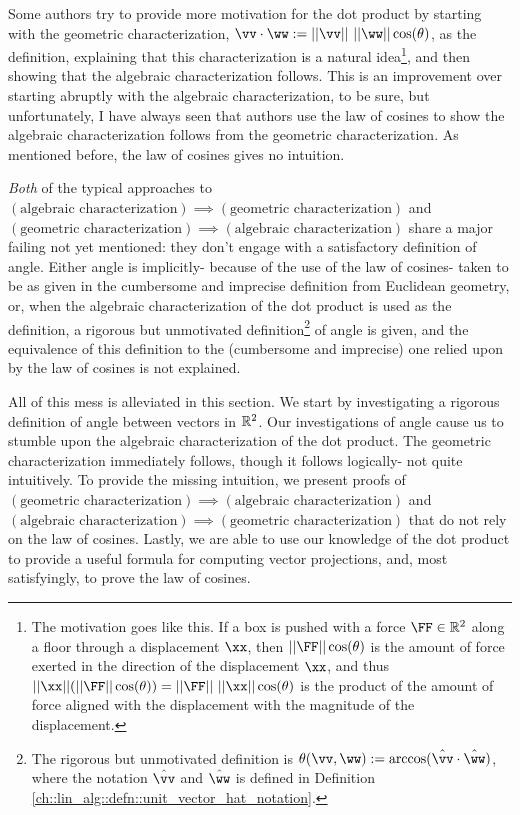 Some authors try to provide more motivation for the dot product by starting with the geometric characterization, $\vv \cdot \ww := ||\vv|| \spc ||\ww|| \cos(\theta)$, as the definition, explaining that this characterization is a natural idea\footnote{The motivation goes like this. If a box is pushed with a force $\FF \in \R^2$ along a floor through a displacement $\xx$, then $||\FF|| \cos(\theta)$ is the amount of force exerted in the direction of the displacement $\xx$, and thus $||\xx||(||\FF|| \cos(\theta)) = ||\FF|| \spc ||\xx|| \cos(\theta)$ is the product of the amount of force aligned with the displacement with the magnitude of the displacement.}, and then showing that the algebraic characterization follows. This is an improvement over starting abruptly with the algebraic characterization, to be sure, but unfortunately, I have always seen that authors use the law of cosines to show the algebraic characterization follows from the geometric characterization. As mentioned before, the law of cosines gives no intuition.

\textit{Both} of the typical approaches to $(\text{algebraic characterization}) \implies (\text{geometric characterization})$ and $(\text{geometric characterization}) \implies (\text{algebraic characterization})$ share a major failing not yet mentioned: they don't engage with a satisfactory definition of angle. Either angle is implicitly- because of the use of the law of cosines- taken to be as given in the cumbersome and imprecise definition from Euclidean geometry, or, when the algebraic characterization of the dot product is used as the definition, a rigorous but unmotivated definition\footnote{The rigorous but unmotivated definition is $\theta(\vv, \ww) := \arccos(\hvv \cdot \hww)$, where the notation $\hvv$ and $\hww$ is defined in Definition \ref{ch::lin_alg::defn::unit_vector_hat_notation}.} of angle is given, and the equivalence of this definition to the (cumbersome and imprecise) one relied upon by the law of cosines is not explained.

All of this mess is alleviated in this section. We start by investigating a rigorous definition of angle between vectors in $\mathbb{R}^2$. Our investigations of angle cause us to stumble upon the algebraic characterization of the dot product. The geometric characterization immediately follows, though it follows logically- not quite intuitively. To provide the missing intuition, we present proofs of $(\text{geometric characterization}) \implies (\text{algebraic characterization})$ and $(\text{algebraic characterization}) \implies (\text{geometric characterization})$ that do not rely on the law of cosines. Lastly, we are able to use our knowledge of the dot product to provide a useful formula for computing vector projections, and, most satisfyingly, to prove the law of cosines.

